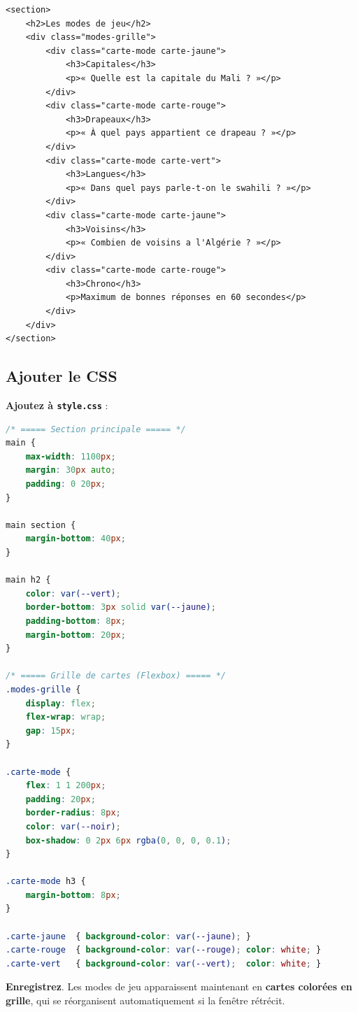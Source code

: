 \documentclass[11pt,a4paper]{article}
\newcommand{\cmark}{\ding{51}}
\begin{document}
\begin{lstlisting}[language=HTML5]
<section>
    <h2>Les modes de jeu</h2>
    <div class="modes-grille">
        <div class="carte-mode carte-jaune">
            <h3>Capitales</h3>
            <p>« Quelle est la capitale du Mali ? »</p>
        </div>
        <div class="carte-mode carte-rouge">
            <h3>Drapeaux</h3>
            <p>« À quel pays appartient ce drapeau ? »</p>
        </div>
        <div class="carte-mode carte-vert">
            <h3>Langues</h3>
            <p>« Dans quel pays parle-t-on le swahili ? »</p>
        </div>
        <div class="carte-mode carte-jaune">
            <h3>Voisins</h3>
            <p>« Combien de voisins a l'Algérie ? »</p>
        </div>
        <div class="carte-mode carte-rouge">
            <h3>Chrono</h3>
            <p>Maximum de bonnes réponses en 60 secondes</p>
        </div>
    </div>
</section>
\end{lstlisting}

\subsection{Ajouter le CSS}

\textbf{Ajoutez à \texttt{style.css}} :

\begin{lstlisting}[language=CSS]
/* ===== Section principale ===== */
main {
    max-width: 1100px;
    margin: 30px auto;
    padding: 0 20px;
}

main section {
    margin-bottom: 40px;
}

main h2 {
    color: var(--vert);
    border-bottom: 3px solid var(--jaune);
    padding-bottom: 8px;
    margin-bottom: 20px;
}

/* ===== Grille de cartes (Flexbox) ===== */
.modes-grille {
    display: flex;
    flex-wrap: wrap;
    gap: 15px;
}

.carte-mode {
    flex: 1 1 200px;
    padding: 20px;
    border-radius: 8px;
    color: var(--noir);
    box-shadow: 0 2px 6px rgba(0, 0, 0, 0.1);
}

.carte-mode h3 {
    margin-bottom: 8px;
}

.carte-jaune  { background-color: var(--jaune); }
.carte-rouge  { background-color: var(--rouge); color: white; }
.carte-vert   { background-color: var(--vert);  color: white; }
\end{lstlisting}

\textbf{Enregistrez}. Les modes de jeu apparaissent maintenant en
\textbf{cartes colorées en grille}, qui se réorganisent automatiquement
si la fenêtre rétrécit. \cmark
\end{document}
